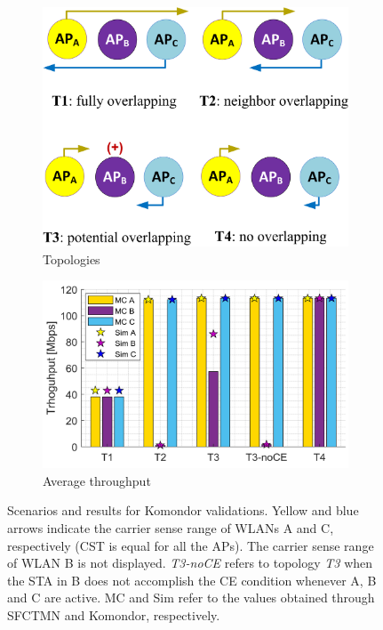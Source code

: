 \documentclass[a4paper]{article}
\begin{document}
	\begin{figure}
		\centering
		\begin{subfigure}{.5\textwidth}
			\centering
			\includegraphics[width=.75\linewidth]{images/scenario_III.png}
			\caption{Topologies}
			\label{fig:scenario_III}
		\end{subfigure}%
		\begin{subfigure}{.5\textwidth}
			\centering
			\includegraphics[width=0.95\linewidth]{images/scenario3_results_sfctmn_komondor.png}
			\caption{Average throughput}
			\label{fig:scenario3_results_sfctmn_komondor}
		\end{subfigure}
		\caption{Scenarios and results for Komondor validations. Yellow and blue arrows indicate the carrier sense range of WLANs A and C, respectively (CST is equal for all the APs). The carrier sense range of WLAN B is not displayed. \textit{T3-noCE} refers to topology \textit{T3} when the STA in B does not accomplish the CE condition whenever A, B and C are active. MC and Sim refer to the values obtained through SFCTMN and Komondor, respectively.}
		\label{fig:scenario_III_all}
	\end{figure}
	
\end{document}
